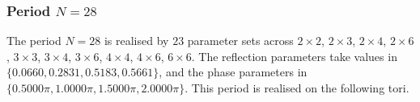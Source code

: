 \par
\subsubsection{Period $N = 28$}
The period $N=28$ is realised by $23$ parameter sets across $2\times2$, $2\times3$, $2\times4$, $2\times6$, $3\times3$, $3\times4$, $3\times6$, $4\times4$, $4\times6$, $6\times6$. The reflection parameters take values in $\{0.0660, 0.2831, 0.5183, 0.5661\}$, and the phase parameters in $\{0.5000\pi, 1.0000\pi, 1.5000\pi, 2.0000\pi\}$. This period is realised on the following tori.

